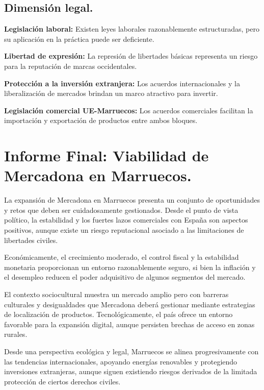 \documentclass{article}  %
\begin{document}
\subsection{Dimensión legal.}\label{dimensiuxf3n-legal.}

\textbf{Legislación laboral:} Existen leyes laborales razonablemente
estructuradas, pero su aplicación en la práctica puede ser deficiente.

\textbf{Libertad de expresión:} La represión de libertades básicas
representa un riesgo para la reputación de marcas occidentales.

\textbf{Protección a la inversión extranjera:} Los acuerdos
internacionales y la liberalización de mercados brindan un marco
atractivo para invertir.

\textbf{Legislación comercial UE-Marruecos:} Los acuerdos comerciales
facilitan la importación y exportación de productos entre ambos bloques.

\section{Informe Final: Viabilidad de Mercadona en
Marruecos.}\label{informe-final-viabilidad-de-mercadona-en-marruecos.}

La expansión de Mercadona en Marruecos presenta un conjunto de
oportunidades y retos que deben ser cuidadosamente gestionados. Desde el
punto de vista político, la estabilidad y los fuertes lazos comerciales
con España son aspectos positivos, aunque existe un riesgo reputacional
asociado a las limitaciones de libertades civiles.

Económicamente, el crecimiento moderado, el control fiscal y la
estabilidad monetaria proporcionan un entorno razonablemente seguro, si
bien la inflación y el desempleo reducen el poder adquisitivo de algunos
segmentos del mercado.

El contexto sociocultural muestra un mercado amplio pero con barreras
culturales y desigualdades que Mercadona deberá gestionar mediante
estrategias de localización de productos. Tecnológicamente, el país
ofrece un entorno favorable para la expansión digital, aunque persisten
brechas de acceso en zonas rurales.

Desde una perspectiva ecológica y legal, Marruecos se alinea
progresivamente con las tendencias internacionales, apoyando energías
renovables y protegiendo inversiones extranjeras, aunque siguen
existiendo riesgos derivados de la limitada protección de ciertos
derechos civiles.
\end{document}
